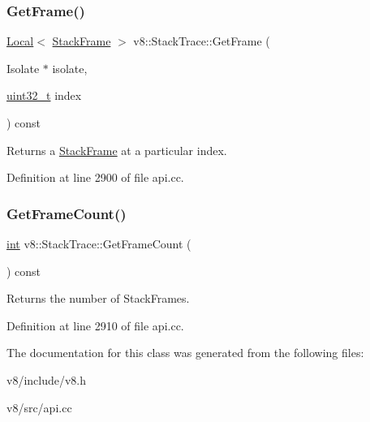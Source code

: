 \subsubsection{\texorpdfstring{Get\+Frame()}{GetFrame()}}
{\footnotesize\ttfamily \mbox{\hyperlink{classv8_1_1Local}{Local}}$<$ \mbox{\hyperlink{classv8_1_1StackFrame}{Stack\+Frame}} $>$ v8\+::\+Stack\+Trace\+::\+Get\+Frame (\begin{DoxyParamCaption}\item[{Isolate $\ast$}]{isolate,  }\item[{\mbox{\hyperlink{classuint32__t}{uint32\+\_\+t}}}]{index }\end{DoxyParamCaption}) const}

Returns a \mbox{\hyperlink{classv8_1_1StackFrame}{Stack\+Frame}} at a particular index. 

Definition at line 2900 of file api.\+cc.

\mbox{\label{classv8_1_1StackTrace_a97a2010fa998f963df290062a8157849}} 
\subsubsection{\texorpdfstring{Get\+Frame\+Count()}{GetFrameCount()}}
{\footnotesize\ttfamily \mbox{\hyperlink{classint}{int}} v8\+::\+Stack\+Trace\+::\+Get\+Frame\+Count (\begin{DoxyParamCaption}{ }\end{DoxyParamCaption}) const}

Returns the number of Stack\+Frames. 

Definition at line 2910 of file api.\+cc.



The documentation for this class was generated from the following files\+:\begin{DoxyCompactItemize}
\item 
v8/include/v8.\+h\item 
v8/src/api.\+cc\end{DoxyCompactItemize}
